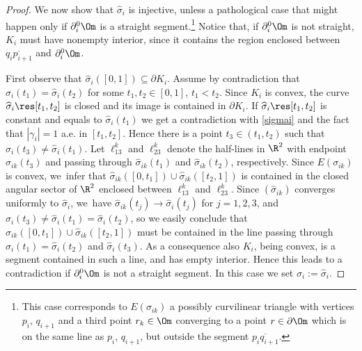 \begin{proof}
We now show that $\widehat\sigma_i$ is injective, unless a pathological case that might happen only if $\partial_i^0\Om$
is a straight segment.\footnote{This case corresponds to $E(\sigma_{ik})$ a possibly curvilinear triangle with vertices $p_i$, $q_{i+1}$ and a third point $r_k\in \Om$ converging to a point $r\in \partial \Om$ which is on the same line as $p_i$, $q_{i+1}$, but outside the segment $\overline{p_iq_{i+1}}$.} Notice that, if $\partial_i^0\Om$ is not straight, $K_i$ must have nonempty interior, since it contains the region enclosed between $\overline {q_ip_{i+1}}$ and $\partial_i^0\Om$.

First observe that $\widehat\sigma_i([0,1])\subseteq \partial K_i$. Assume by contradiction that $\widehat\sigma_i(t_1)=\widehat\sigma_i(t_2)$ for some $t_1,t_2\in [0,1]$, $t_1<t_2$. Since $K_i$ is convex, the curve $\widehat\sigma_i\res [t_1,t_2]$ is closed and its image is contained in $\partial K_i$. If $\widehat\sigma_i\res [t_1,t_2]$ is constant and equals to $\widehat\sigma_i(t_1)$ we get a contradiction with \eqref{sigmai} and the fact that $|\gamma_i|=1$ a.e. in $[t_1,t_2]$. Hence there is a point $t_3\in(t_1,t_2)$ such that $\widehat\sigma_i(t_3)\neq \widehat\sigma_i(t_1)$. Let $\ell^k_{13}$ and $\ell^k_{23}$
denote the half-lines in $\R^2$ with endpoint ${\widehat\sigma_{ik}(t_3)}$ and passing through $\widehat\sigma_{ik}(t_1)$ and $\widehat\sigma_{ik}(t_2)$, respectively.
Since $E(\sigma_{ik})$ is convex, we~infer that $\widehat\sigma_{ik}([0,t_1])\cup \widehat\sigma_{ik}([t_2,1])$ is contained in the closed angular sector of $\R^2$ enclosed between $\ell^k_{13}$ and $\ell^k_{23}$.
Since $(\widehat\sigma_{ik})$ converges uniformly to $\widehat\sigma_i$, we~have
$\widehat\sigma_{ik}(t_j)\to \widehat\sigma_{i}(t_j)$ for $j=1,2,3$, and $\widehat\sigma_i(t_3)\neq \widehat\sigma_i(t_1)=\widehat\sigma_i(t_2)$, so we easily conclude that $\widehat\sigma_{ik}([0,t_1])\cup \widehat\sigma_{ik}([t_2,1])$ must be contained in the line passing through $ {\widehat\sigma_{i}(t_1)=\widehat\sigma_{i}(t_2)}$ and ${\widehat\sigma_{i}(t_3)}$. As a consequence also $K_i$, being convex, is a segment contained in such a line, and has empty interior. Hence this leads to a contradiction if $\partial_i^0\Om$ is not a straight segment. In this case we set $\sigma_i:=\widehat\sigma_i$.


\end{proof}
